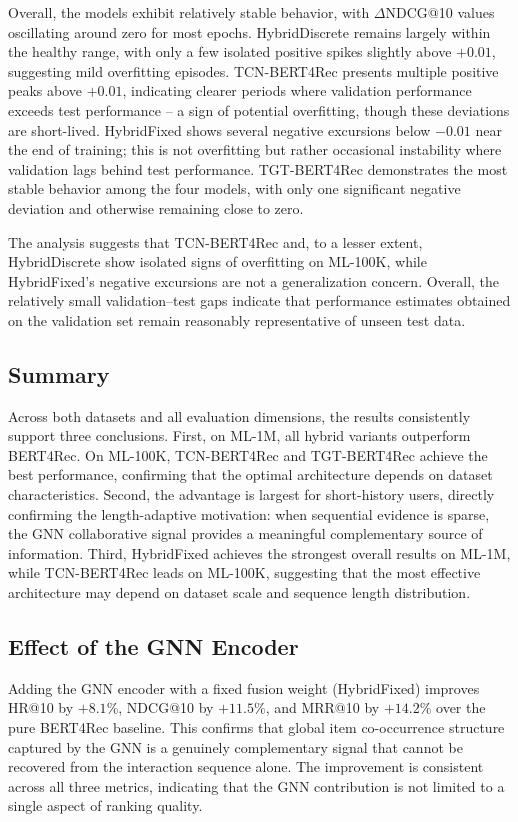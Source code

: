 \documentclass[12pt,a4paper]{report}
\begin{document}
Overall, the models exhibit relatively stable behavior, with
$\Delta$NDCG@10 values oscillating around zero for most epochs.
HybridDiscrete remains largely within the healthy range, with only a few
isolated positive spikes slightly above $+0.01$, suggesting mild
overfitting episodes. TCN-BERT4Rec presents multiple positive peaks above
$+0.01$, indicating clearer periods where validation performance exceeds
test performance – a sign of potential overfitting, though these
deviations are short-lived. HybridFixed shows several negative excursions
below $-0.01$ near the end of training; this is not overfitting but rather
occasional instability where validation lags behind test performance.
TGT-BERT4Rec demonstrates the most stable behavior among the four models,
with only one significant negative deviation and otherwise remaining close
to zero.

The analysis suggests that TCN-BERT4Rec and, to a lesser extent,
HybridDiscrete show isolated signs of overfitting on ML-100K, while
HybridFixed's negative excursions are not a generalization concern.
Overall, the relatively small validation--test gaps indicate that
performance estimates obtained on the validation set remain reasonably
representative of unseen test data.

\subsection{Summary}

\justifying
Across both datasets and all evaluation dimensions, the results
consistently support three conclusions. First, on ML-1M, all hybrid
variants outperform BERT4Rec. On ML-100K, TCN-BERT4Rec and
TGT-BERT4Rec achieve the best performance, confirming that the
optimal architecture depends on dataset characteristics. Second, the
advantage is largest for short-history users, directly confirming the
length-adaptive motivation: when sequential evidence is sparse, the
GNN collaborative signal provides a meaningful complementary source
of information. Third, \mbox{HybridFixed} achieves the strongest
overall results on ML-1M, while TCN-BERT4Rec leads on ML-100K,
suggesting that the most effective architecture may depend on dataset
scale and sequence length distribution.

\subsection*{Effect of the GNN Encoder}

\justifying
Adding the GNN encoder with a fixed fusion weight (\mbox{HybridFixed}) improves
HR@10 by \(+8.1\%\), NDCG@10 by \(+11.5\%\), and MRR@10 by \(+14.2\%\)
over the pure BERT4Rec baseline. This confirms that global item co-occurrence
structure captured by the GNN is a genuinely complementary signal that cannot
be recovered from the interaction sequence alone. The improvement is consistent
across all three metrics, indicating that the GNN contribution is not limited
to a single aspect of ranking quality.
\end{document}
